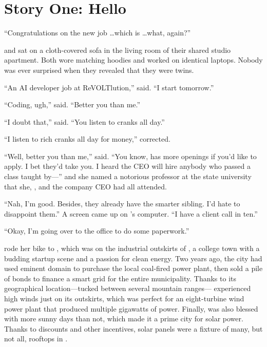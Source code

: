 \chapter{Story One: Hello \crunchyCity{}}


``Congratulations on the new job \dots which is \dots what, again?''

{\protag} and {\sidetag} {\lastname} sat on a cloth-covered sofa in the living room of their shared studio apartment. Both wore matching hoodies and worked on identical laptops. Nobody was ever surprised when they revealed that they were twins.

``An AI developer job at ReVOLTlution,'' {\protag} said. ``I start tomorrow.''

``Coding, ugh,” {\sidetag} said. ``Better you than me.''

``I doubt that,'' {\protag} said. ``You listen to cranks all day.''

``I listen to rich cranks all day for money,'' {\sidetag} corrected.

``Well, better you than me,'' {\protag} said. ``You know, \energyCompany{} has more openings if you’d like to apply. I bet they’d take you. I heard the CEO will hire anybody who passed a class taught by---'' and she named a notorious professor at the state university that she, {\sidetag}, and the company CEO had all attended.

``Nah, I'm good. Besides, they already have the smarter sibling. I'd hate to disappoint them.'' A screen came up on {\sidetag}’s computer. ``I have a client call in ten.''

``Okay, I’m going over to the office to do some paperwork.''

{\protag} rode her bike to \energyCompany{}, which was on the industrial outskirts of \crunchyCity{}, a college town with a budding startup scene and a passion for clean energy. Two years ago, the city had used eminent domain to purchase the local coal-fired power plant, then sold a pile of bonds to finance a smart grid for the entire municipality. Thanks to its geographical location---tucked between several mountain ranges---\crunchyCity{} experienced high winds just on its outskirts, which was perfect for an eight-turbine wind power plant that produced multiple gigawatts of power. Finally, \crunchyCity{} was also blessed with more sunny days than not, which made it a prime city for solar power. Thanks to discounts and other incentives, solar panels were a fixture of many, but not all, rooftops in \crunchyCity{}.


